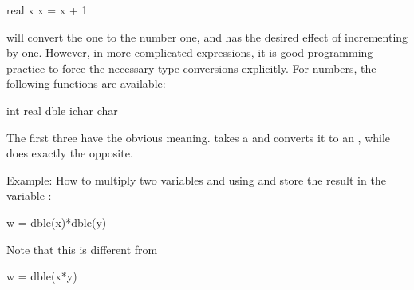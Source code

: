 \begin{fortran77}
      real x
      x = x + 1
\end{fortran77}

will convert the  one to the
 number one, and has the desired effect of
incrementing  by one. However, in more complicated
expressions, it is good programming practice to force the necessary type
conversions explicitly. For numbers, the following functions are
available:

\begin{fortran77}
      int
      real
      dble
      ichar
      char
\end{fortran77}

The first three have the obvious meaning.  takes
a  and converts it to an
, while  does exactly the
opposite.

Example: How to multiply two  variables
 and  using
 and store the result in the
 variable :

\begin{fortran77}
      w = dble(x)*dble(y)
\end{fortran77}

Note that this is different from

\begin{fortran77}
      w = dble(x*y)
\end{fortran77}
